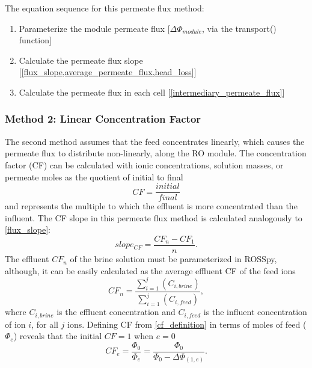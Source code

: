 \documentclass[journal=ACSES&TWater,manuscript=article]{achemso}
\begin{document}
The equation sequence for this permeate flux method:
\begin{enumerate}
    \item Parameterize the module permeate flux [$\Delta \Phi_{module}$, via the transport() function]
    \item Calculate the permeate flux slope [\cref{flux_slope,average_permeate_flux,head_loss}]
    \item Calculate the permeate flux in each cell [\cref{intermediary_permeate_flux}]
\end{enumerate}


\subsubsection{Method 2: Linear Concentration Factor}
The second method assumes that the feed concentrates linearly, which causes the permeate flux to distribute non-linearly, along the RO module. The concentration factor (CF) \cite{McCaffrey1987TheHalite.,Casas2012SeawaterElectrodialysis,Kartashevsky2015PhosphateEffluents,Yan2017ReverseVelocity} can be calculated with ionic concentrations, solution masses, or permeate moles as the quotient of initial to final  \cite{Casas2012SeawaterElectrodialysis,Yan2017ReverseVelocity}
\begin{equation} \label{cf_definition}
    CF = \frac{initial}{final}
\end{equation}
and represents the multiple to which the effluent is more concentrated than the influent. The CF slope in this permeate flux method is calculated analogously to \cref{flux_slope}:
\begin{equation} \label{average_cf_slope}
    slope_{CF} =\frac{CF_{n}-CF_1}{n}.
\end{equation}
The effluent $CF_{n}$ of the brine solution must be parameterized in ROSSpy, although, it can be easily calculated as the average effluent CF of the feed ions 
\begin{equation} \label{cf_calculation_output}
    CF_{n}=\frac{\sum_{i=1}^j(C_{i,brine})}{\sum_{i=1}^j(C_{i,feed})},
\end{equation}
where $C_{i,brine}$ is the effluent concentration and $C_{i,feed}$ is the influent concentration of ion $i$, for all $j$ ions. Defining CF from \cref{cf_definition} in terms of moles of feed ($\Phi_e$) reveals that the initial $CF=1$ when $e=0$ 
\begin{equation} \label{cf_cell_definition}
    CF_e=\frac{\Phi_0}{\Phi_e}=\frac{\Phi_0}{\Phi_0-\Delta \Phi_{(1,e)}}.
\end{equation}
\end{document}
